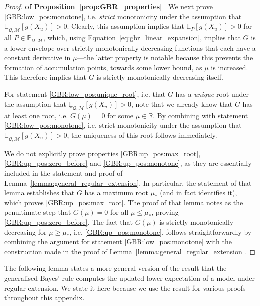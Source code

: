 \documentclass[twoside,11pt]{article}
\newcommand{\reals}{\mathbb{R}}
\newcommand{\lexp}{\underline{\mathbb{E}}_{\rateset,\mathcal{M}}}
\newcommand{\rateset}{\mathcal{Q}}
\begin{document}
\begin{proof}{\bf of Proposition~\ref{prop:GBR_properties}~}
We next prove \ref{GBR:low_pos:monotone}, i.e. \emph{strict} monotonicity under the assumption that $\lexp[g(X_u)]>0$. Clearly, this assumption implies that $\mathbb{E}_P[g(X_u)]>0$ for all $P\in\mathbb{P}_{\rateset,\mathcal{M}}$, which, using Equation~\ref{eq:gbr_linear_expansion}, implies that $G$ is a lower envelope over strictly monotonically decreasing functions that each have a constant derivative in $\mu$---the latter property is notable because this prevents the formation of accumulation points, towards some lower bound, as $\mu$ is increased. This therefore implies that $G$ is strictly monotonically decreasing itself.

For statement \ref{GBR:low_pos:unique_root}, i.e. that $G$ has a \emph{unique} root under the assumption that $\lexp[g(X_u)]>0$, note that we already know that $G$ has at least one root, i.e. $G(\mu)=0$ for some $\mu\in\reals$. By combining with statement \ref{GBR:low_pos:monotone}, i.e. strict monotonicity under the assumption that $\lexp[g(X_u)]>0$, the uniqueness of this root follows immediately.

We do not explicitly prove properties \ref{GBR:up_pos:max_root}, \ref{GBR:up_pos:zero_before} and \ref{GBR:up_pos:monotone}, as they are essentially included in the statement and proof of Lemma~\ref{lemma:general_regular_extension}. In particular, the statement of that lemma establishes that $G$ has a maximum root $\mu_*$ (and in fact identifies it), which proves \ref{GBR:up_pos:max_root}. The proof of that lemma notes as the penultimate step that $G(\mu)=0$ for all $\mu\leq \mu_*$, proving \ref{GBR:up_pos:zero_before}. The fact that $G(\mu)$ is strictly monotonically decreasing for $\mu\geq \mu_*$, i.e. \ref{GBR:up_pos:monotone}, follows straightforwardly by combining the argument for statement \ref{GBR:low_pos:monotone} with the construction made in the proof of Lemma~\ref{lemma:general_regular_extension}.
\end{proof}

The following lemma states a more general version of the result that the generalised Bayes' rule computes the updated lower expectation of a model under regular extension. We state it here because we use the result for various proofs throughout this appendix.
\end{document}
